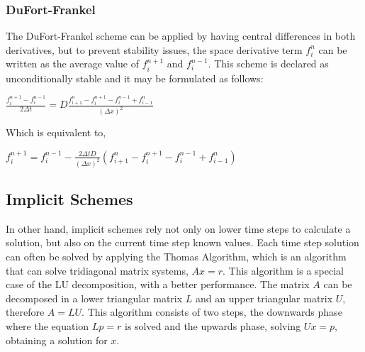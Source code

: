 \documentclass[12pt]{report}
\begin{document}
\subsubsection*{DuFort-Frankel}
\par The DuFort-Frankel scheme can be applied by having central differences in both derivatives, but to prevent stability issues, the space derivative term $f_i^n$ can be written as the average value of $f_{i}^{n + 1}$ and $f_{i}^{n - 1}$. This scheme is declared as unconditionally stable and it may be formulated as follows:
\begin{center}
\Large
$
\frac{f_i^{n + 1} - f_i^{n - 1}}{2 \Delta t} = D \frac{f_{i + 1}^{n} - f_{i}^{n + 1} - f_{i}^{n - 1} + f_{i - 1}^{n}}{(\Delta x)^2}
$
\end{center}
\par Which is equivalent to,
\begin{center}
\Large
$
f_{i}^{n + 1} = f_{i}^{n - 1} - \frac{2\Delta t D}{(\Delta x)^2} (f_{i + 1}^{n} - f_{i}^{n + 1} - f_{i}^{n - 1} + f_{i - 1}^{n})
$
\end{center}

\subsection*{Implicit Schemes}

\par In other hand, implicit schemes rely not only on lower time steps to calculate a solution, but also on the current time step known values. Each time step solution can often be solved by applying the Thomas Algorithm, which is an algorithm that can solve tridiagonal matrix systems, $Ax = r$. This algorithm is a special case of the LU decomposition, with a better performance. The matrix $A$ can be decomposed in a lower triangular matrix $L$ and an upper triangular matrix $U$, therefore $A = LU$. This algorithm consists of two steps, the downwards phase where the equation $Lp = r$ is solved and the upwards phase, solving $Ux = p$, obtaining a solution for $x$. 
\end{document}
